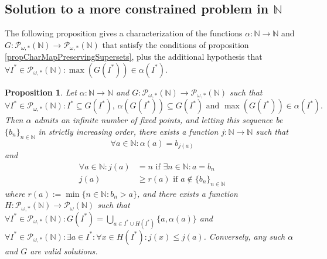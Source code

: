 \documentclass[a4paper,11pt]{article}
\theoremstyle{plain}
\newtheorem{proposition}{Proposition}[section]
\theoremstyle{definition}
\theoremstyle{remark}
\begin{document}
\subsection{Solution to a more constrained problem in $\mathbb{N}$}

The following proposition gives a characterization of the functions $\alpha : \mathbb{N} \to \mathbb{N}$ and $G : \mathcal{P}_{\omega,*}(\mathbb{N}) \to \mathcal{P}_{\omega,*}(\mathbb{N})$ that satisfy the conditions of proposition \ref{propCharMapPreservingSupersets}, plus the additional hypothesis that $ \forall I^* \in \mathcal{P}_{\omega,*}(\mathbb{N}) : \max(G(I^*)) \in \alpha(I^*)$.

\begin{proposition}
\label{propCharMapPreservingSupersetsWithMaxCondition}
Let $\alpha : \mathbb{N} \to \mathbb{N}$ and $G : \mathcal{P}_{\omega,*}(\mathbb{N}) \to \mathcal{P}_{\omega,*}(\mathbb{N})$ such that 
\[ \forall I^* \in \mathcal{P}_{\omega,*}(\mathbb{N}) : I^* \subseteq G(I^*) \text{, } \alpha(G(I^*)) \subseteq G(I^*) \text{ and } \max(G(I^*)) \in \alpha(I^*). \]
Then $\alpha$ admits an infinite number of fixed points, and letting this sequence be $\{b_n\}_{n \in \mathbb{N}}$ in strictly increasing order, there exists a function $j : \mathbb{N} \to \mathbb{N}$ such that 
\[ \forall a \in \mathbb{N} : \alpha(a) = b_{j(a)} \]
and
\begin{align*}
\forall a \in \mathbb{N} : j(a) &= n \text{ if } \exists n \in \mathbb{N} : a = b_n \\
j(a) &\geq r(a) \text{ if } a \notin \{b_n\}_{n \in \mathbb{N}}
\end{align*}
where $r(a) := \min\{n \in \mathbb{N} : b_n > a \}$, and there exists a function $H : \mathcal{P}_{\omega,*}(\mathbb{N}) \to  \mathcal{P}_{\omega}(\mathbb{N})$ such that $\forall I^* \in  \mathcal{P}_{\omega,*}(\mathbb{N}) : G(I^*) = \bigcup_{a \in I^* \cup H(I^*)} \{a,\alpha(a)\}$ and $\forall I^* \in  \mathcal{P}_{\omega,*}(\mathbb{N}) : \exists a \in I^* : \forall x \in H(I^*) : j(x) \leq j(a)$. Conversely, any such $\alpha$ and $G$ are valid solutions. \\
\end{proposition}
\end{document}
